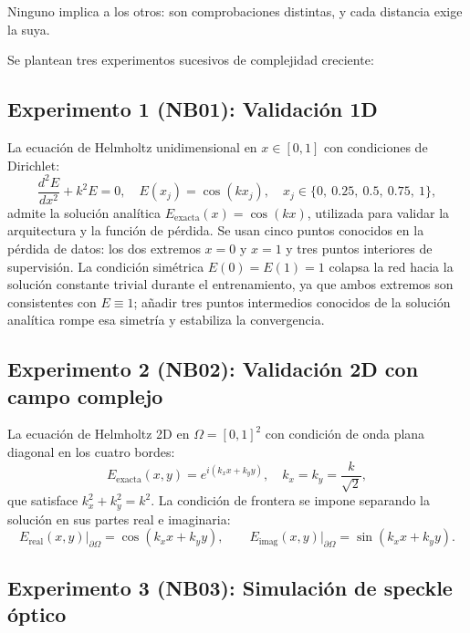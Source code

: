 Ninguno implica a los otros: son comprobaciones distintas, y cada distancia
exige la suya.

Se plantean tres experimentos sucesivos de complejidad creciente:

\subsection{Experimento 1 (NB01): Validación 1D}

La ecuación de Helmholtz unidimensional en $x \in [0,1]$ con condiciones de
Dirichlet:
%
\begin{equation}
    \frac{d^2 E}{dx^2} + k^2 E = 0, \quad
    E(x_j) = \cos(k x_j), \quad x_j \in \{0,\ 0.25,\ 0.5,\ 0.75,\ 1\},
    \label{eq:helmholtz1d}
\end{equation}
%
admite la solución analítica $E_\text{exacta}(x) = \cos(kx)$, utilizada para
validar la arquitectura y la función de pérdida. Se usan cinco puntos
conocidos en la pérdida de datos: los dos extremos $x=0$ y $x=1$ y tres puntos
interiores de supervisión. La
condición simétrica $E(0) = E(1) = 1$ colapsa la red hacia la solución
constante trivial durante el entrenamiento, ya que ambos extremos son
consistentes con $E \equiv 1$; añadir tres puntos intermedios conocidos de la
solución analítica rompe esa simetría y estabiliza la convergencia.

\subsection{Experimento 2 (NB02): Validación 2D con campo complejo}

La ecuación de Helmholtz 2D en $\Omega = [0,1]^2$ con condición de onda plana
diagonal en los cuatro bordes:
%
\begin{equation}
    E_\text{exacta}(x,y) = e^{i(k_x x + k_y y)}, \quad
    k_x = k_y = \frac{k}{\sqrt{2}},
    \label{eq:solucion2d}
\end{equation}
%
que satisface $k_x^2 + k_y^2 = k^2$. La condición de frontera se impone
separando la solución en sus partes real e imaginaria:
%
\begin{equation}
    E_\text{real}(x,y)\big|_{\partial\Omega} = \cos(k_x x + k_y y), \qquad
    E_\text{imag}(x,y)\big|_{\partial\Omega} = \sin(k_x x + k_y y).
\end{equation}

\subsection{Experimento 3 (NB03): Simulación de speckle óptico}
\label{cap3:nb03}

